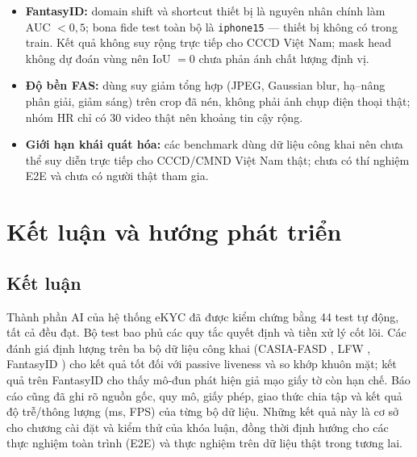 \documentclass[12pt,a4paper]{article}
\begin{document}
\begin{itemize}
        huấn luyện có thể đã thấy LFW (không kiểm chứng được) nên FAR/FRR là \textbf{cận trên lạc quan}.
        Đây là đánh giá recognition trên cặp chuẩn, không phải end-to-end selfie--CCCD.
  \item \textbf{FantasyID:} domain shift và shortcut thiết bị là nguyên nhân chính làm AUC $<0{,}5$;
        bona fide test toàn bộ là \texttt{iphone15} --- thiết bị không có trong train. Kết quả không suy
        rộng trực tiếp cho CCCD Việt Nam; mask head không dự đoán vùng nên IoU $=0$ chưa phản ánh chất
        lượng định vị.
  \item \textbf{Độ bền FAS:} dùng suy giảm tổng hợp (JPEG, Gaussian blur, hạ--nâng phân giải, giảm sáng)
        trên crop đã nén, không phải ảnh chụp điện thoại thật; nhóm HR chỉ có 30 video thật nên khoảng
        tin cậy rộng.
  \item \textbf{Giới hạn khái quát hóa:} các benchmark dùng dữ liệu công khai nên chưa thể suy diễn trực tiếp
        cho CCCD/CMND Việt Nam thật; chưa có thí nghiệm E2E và chưa có người thật tham gia.
\end{itemize}

\section{Kết luận và hướng phát triển}
\subsection{Kết luận}
Thành phần AI của hệ thống eKYC đã được kiểm chứng bằng 44 test tự động, tất cả đều đạt. Bộ test bao phủ
các quy tắc quyết định và tiền xử lý cốt lõi. Các đánh giá định lượng trên ba bộ dữ liệu công khai
(CASIA-FASD \cite{zhang2012casia}, LFW \cite{huang2008lfw}, FantasyID \cite{korshunov2025fantasyid})
cho kết quả tốt đối với passive liveness và so khớp khuôn mặt; kết quả trên FantasyID cho thấy mô-đun
phát hiện giả mạo giấy tờ còn hạn chế. Báo cáo cũng đã ghi rõ nguồn gốc, quy mô, giấy phép, giao thức
chia tập và kết quả độ trễ/thông lượng (ms, FPS) của từng bộ dữ liệu. Những kết quả này là cơ sở cho
chương cài đặt và kiểm thử của khóa luận, đồng thời định hướng cho các thực nghiệm toàn trình (E2E) và
thực nghiệm trên dữ liệu thật trong tương lai.
\end{document}

